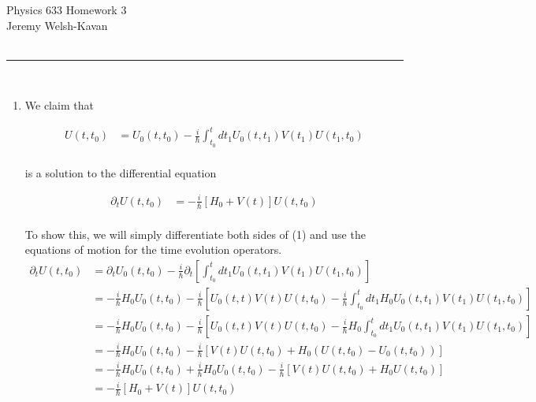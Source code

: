 \documentclass[]{article}
\begin{document}
{\Large Physics 633 Homework 3}\\
{Jeremy Welsh-Kavan}\\
\hfill \\
\noindent\rule{15cm}{0.4pt} \\

\begin{enumerate}[1)]

\item We claim that

\begin{equation}
\begin{split}
U(t,t_0) & = U_0(t,t_0) - \frac{i}{\hbar} \int_{t_0}^{t} dt_1 U_0(t, t_1) V(t_1) U(t_1,t_0) \\
\end{split}
\end{equation}

is a solution to the differential equation

\begin{equation}
\begin{split}
\partial_t U(t,t_0) & = - \frac{i}{\hbar} \left[ H_0 + V(t) \right] U(t,t_0) \\
\end{split}
\end{equation}

To show this, we will simply differentiate both sides of (1) and use the equations of motion for the time evolution operators. \\

\begin{equation}
\begin{split}
\partial_t U(t,t_0) & = \partial_t  U_0(t,t_0) - \frac{i}{\hbar} \partial_t  \left[ \int_{t_0}^{t} dt_1 U_0(t, t_1) V(t_1) U(t_1,t_0) \right] \\
& = - \frac{i}{\hbar} H_0 U_0(t,t_0) - \frac{i}{\hbar}  \left[  U_0(t, t) V(t) U(t,t_0) - \frac{i}{\hbar}  \int_{t_0}^{t} dt_1  H_0 U_0(t, t_1) V(t_1) U(t_1,t_0) \right]  \\
& = - \frac{i}{\hbar} H_0 U_0(t,t_0) - \frac{i}{\hbar}  \left[  U_0(t, t) V(t) U(t,t_0)  - \frac{i}{\hbar} H_0 \int_{t_0}^{t} dt_1  U_0(t, t_1) V(t_1) U(t_1,t_0) \right]  \\
& = - \frac{i}{\hbar} H_0 U_0(t,t_0) - \frac{i}{\hbar}  \left[ V(t) U(t,t_0)  + H_0 \left( U(t,t_0) - U_0(t,t_0) \right) \right]  \\
& = - \frac{i}{\hbar} H_0 U_0(t,t_0)  + \frac{i}{\hbar} H_0  U_0(t,t_0)  - \frac{i}{\hbar} \left[  V(t) U(t,t_0)  + H_0  U(t,t_0)  \right] \\
& = - \frac{i}{\hbar} \left[ H_0    +  V(t)   \right] U(t,t_0) \\
\end{split}
\end{equation}


\end{enumerate}
\end{document}
